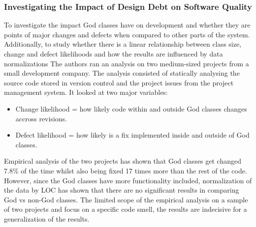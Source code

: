 \documentclass{mprop}
\begin{document}
\subsubsection{Investigating the Impact of Design Debt on Software Quality}
\cite{Zazworka2011} To investigate the impact God classes have on development
and whether they are points of major changes and defects when compared to other
parts of the system. Additionally, to study whether there is a linear
relationship between class size, change and defect likelihoods and how the
results are influenced by data normalizations The authors ran an analysis on two
medium-sized projects from a small development company. The analysis consisted
of statically analysing the source code stored in version control and the
project issues from the project management system. It looked at two major
variables:
\begin{itemize}
\item Change likelihood = how likely code within and outside God classes changes
accross revisions.
\item Defect likelihood = how likely is a fix implemented inside and outside of
God classes.
\end{itemize}
Empirical analysis of the two projects has shown that God classes get changed
7.8\% of the time whilst also being fixed 17 times more than the rest of the
code. However, since the God classes have more functionality included,
normalization of the data by LOC has shown that there are no significant results
in comparing God vs non-God classes. The limited scope of the empirical analysis
on a sample of two projects and focus on a specific code smell, the results are
indecisive for a generalization of the results.
\end{document}
